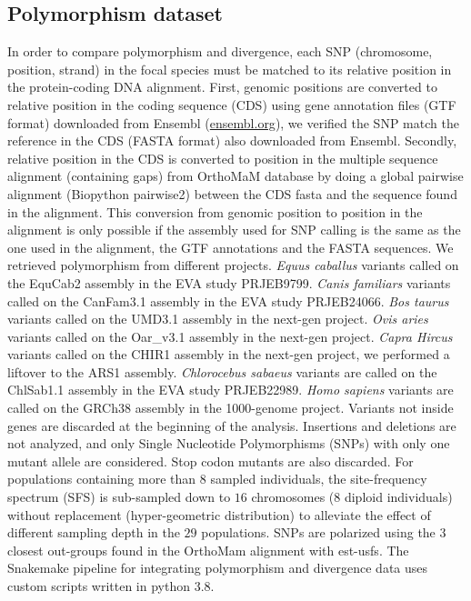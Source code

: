 \documentclass{article}
\begin{document}
    \subsection{Polymorphism dataset}
    \label{subsec:polymorphism-dataset}

    In order to compare polymorphism and divergence, each SNP (chromosome, position, strand) in the focal species must be matched to its relative position in the protein-coding DNA alignment.
    First, genomic positions are converted to relative position in the coding sequence (CDS) using gene annotation files (GTF format) downloaded from Ensembl (\url{ensembl.org}), we verified the SNP match the reference in the CDS (FASTA format) also downloaded from Ensembl.
    Secondly, relative position in the CDS is converted to position in the multiple sequence alignment (containing gaps) from OrthoMaM database\cite{ranwez_orthomam_2007, douzery_orthomam_2014, scornavacca_orthomam_2019} by doing a global pairwise alignment (Biopython pairwise2) between the CDS fasta and the sequence found in the alignment.
    This conversion from genomic position to position in the alignment is only possible if the assembly used for SNP calling is the same as the one used in the alignment, the GTF annotations and the FASTA sequences.
    We retrieved polymorphism from different projects.
    \textit{Equus caballus} variants called on the EquCab2 assembly in the EVA study PRJEB9799.
    \textit{Canis familiars} variants called on the CanFam3.1 assembly in the EVA study PRJEB24066.
    \textit{Bos taurus} variants called on the UMD3.1 assembly in the next-gen project.
    \textit{Ovis aries} variants called on the Oar\_v3.1 assembly in the next-gen project.
    \textit{Capra Hircus} variants called on the CHIR1 assembly in the next-gen project, we performed a liftover to the ARS1 assembly.
    \textit{Chlorocebus sabaeus} variants are called on the ChlSab1.1 assembly in the EVA study PRJEB22989\cite{svardal_ancient_2017}.
    \textit{Homo sapiens} variants are called on the GRCh38 assembly in the 1000-genome project\cite{consortium_integrated_2012, the1000genomesprojectconsortium_global_2015}.
    Variants not inside genes are discarded at the beginning of the analysis.
    Insertions and deletions are not analyzed, and only Single Nucleotide Polymorphisms (SNPs) with only one mutant allele are considered.
    Stop codon mutants are also discarded.
    For populations containing more than $8$ sampled individuals, the site-frequency spectrum (SFS) is sub-sampled down to $16$ chromosomes ($8$ diploid individuals) without replacement (hyper-geometric distribution) to alleviate the effect of different sampling depth in the $29$ populations.
    SNPs are polarized using the $3$ closest out-groups found in the OrthoMam alignment with est-usfs\cite{keightley_inferring_2018}.
    The Snakemake pipeline for integrating polymorphism and divergence data uses custom scripts written in python 3.8.
\end{document}
